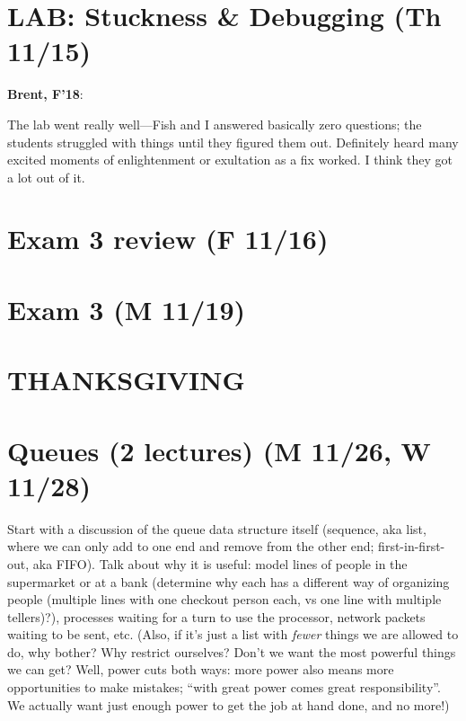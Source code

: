 \documentclass{article}
\newenvironment{reflect}[1]
{
  \noindent
  \begin{lrbox}{\reflectbox}
    \begin{minipage}[t]{\textwidth}
      \textbf{#1}:
}{
    \end{minipage}
  \end{lrbox}
  \fbox{\usebox{\reflectbox}}
}
\newcommand{\notready}{\textcolor{red}{\XSolidBold}\xspace}
\begin{document}
\newpage
\section{\notready LAB: Stuckness \& Debugging (Th 11/15)}

\begin{reflect}{Brent, F'18}
  The lab went really well---Fish and I answered basically zero
  questions; the students struggled with things until they figured
  them out.  Definitely heard many excited moments of enlightenment or
  exultation as a fix worked.  I think they got a lot out of it.
\end{reflect}

\newpage
\section{\notready Exam 3 review (F 11/16)}

\newpage
\section{\notready Exam 3 (M 11/19)}

\newpage
\section{\notready THANKSGIVING}

\newpage
\section{\notready Queues (2 lectures) (M 11/26, W 11/28)}

Start with a discussion of the queue data structure itself (sequence,
aka list, where we can only add to one end and remove from the other
end; first-in-first-out, aka FIFO).  Talk about why it is useful:
model lines of people in the supermarket or at a bank (determine why
each has a different way of organizing people (multiple lines with one
checkout person each, vs one line with multiple tellers)?), processes
waiting for a turn to use the processor, network packets waiting to be
sent, etc.  (Also, if it's just a list with \emph{fewer} things we are
allowed to do, why bother?  Why restrict ourselves?  Don't we want the
most powerful things we can get?  Well, power cuts both ways: more
power also means more opportunities to make mistakes; ``with great
power comes great responsibility''.  We actually want just enough
power to get the job at hand done, and no more!)
\end{document}
